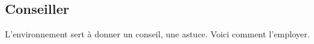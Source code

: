 

\usepackage[lang = french]{../main/main}
\usepackage{../macroenv/macroenv}
\usepackage{../showcase/showcase}
\usepackage{../listing/listing}
\usepackage{../inenglish/inenglish}


\usepackage{focus}





\subsection{Conseiller}

L'environnement  sert à donner un conseil, une astuce. Voici comment l'employer.



